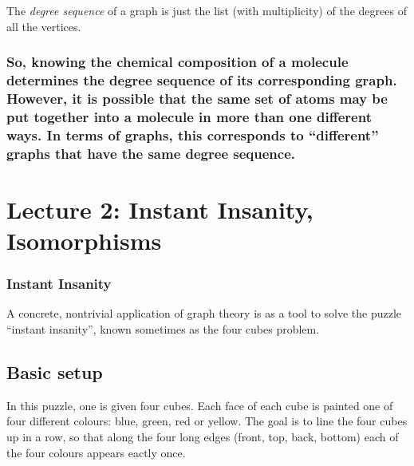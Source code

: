 \documentclass[]{article}
\begin{document}
The \emph{degree sequence} of a graph is just the list (with
multiplicity) of the degrees of all the vertices.

\subsubsection{\texorpdfstring{So, knowing the chemical composition of a
molecule determines the degree sequence of its corresponding graph.
However, it is possible that the same set of atoms may be put together
into a molecule in more than one different ways. In terms of graphs,
this corresponds to ``different'' graphs that have the same degree
sequence.}{So, knowing the chemical composition of a molecule determines the degree sequence of its corresponding graph. However, it is possible that the same set of atoms may be put together into a molecule in more than one different ways. In terms of graphs, this corresponds to different graphs that have the same degree sequence.}}\label{so-knowing-the-chemical-composition-of-a-molecule-determines-the-degree-sequence-of-its-corresponding-graph.-however-it-is-possible-that-the-same-set-of-atoms-may-be-put-together-into-a-molecule-in-more-than-one-different-ways.-in-terms-of-graphs-this-corresponds-to-different-graphs-that-have-the-same-degree-sequence.}

\section{Lecture 2: Instant Insanity, Isomorphisms }

\subsubsection{Instant Insanity}\label{instant-insanity}

A concrete, nontrivial application of graph theory is as a tool to solve
the puzzle ``instant insanity'', known sometimes as the four cubes
problem.

\subsection{Basic setup}\label{basic-setup}

In this puzzle, one is given four cubes. Each face of each cube is
painted one of four different colours: blue, green, red or yellow. The
goal is to line the four cubes up in a row, so that along the four long
edges (front, top, back, bottom) each of the four colours appears eactly
once.
\end{document}

